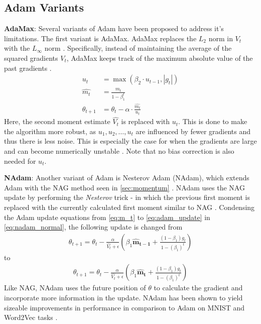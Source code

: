 \subsection{Adam Variants}
\textbf{AdaMax}: Several variants of Adam have been proposed to address it's limitations. The first variant is AdaMax. AdaMax replaces the $L_2$ norm in $V_t$ with the $L_{\infty}$ norm \citep{kingma2014adam}. Specifically, instead of maintaining the average of the squared gradients $V_t$, AdaMax keeps track of the maximum absolute value of the past gradients \citep{kingma2014adam}.
\begin{align}
    u_t &= \max(\beta_2 \cdot u_{t-1}, |g_t|) \\ 
    \hat{m_t} &= \frac{m_t}{1 - \beta_1^t} \\
    \theta_{t+1} &= \theta_t - \alpha \cdot \frac{\hat{m_t}}{u_t}
\end{align}
Here, the second moment estimate $\hat{V_t}$ is replaced with $u_t$. This is done to make the algorithm more robust, as $u_1, u_2, \dots, u_t$ are influenced by fewer gradients and thus there is less noise. This is especially the case for when the gradients are large and can become numerically unstable \citep{kingma2014adam}. Note that no bias correction is also needed for $u_t$.

\textbf{NAdam}: Another variant of Adam is Nesterov Adam (NAdam), which extends Adam with the NAG method seen in \cref{sec:momentum} \citep{dozat2016nadam}. NAdam uses the NAG update by performing the \textit{Nesterov} trick - in which the previous first moment is replaced with the currently calculated first moment similar to NAG \citep{nesterov1983method,dozat2016nadam}. Condensing the Adam update equations from \cref{eq:m_t} to \cref{eq:adam_update} in \cref{eq:nadam_normal}, the following update is changed from 
\begin{align}
    \theta_{t+1} = \theta_t - \frac{\alpha}{{\hat{V_t}} + \epsilon} (\beta_1 \mathbf{\hat{m}_{t-1}} + \frac{(1 - \beta_1)g_t}{1 - (\beta_1)^t}) \label{eq:nadam_normal}
\end{align}
to 
\begin{align}
    \theta_{t+1} = \theta_t - \frac{\alpha}{{\hat{V_t}} + \epsilon} (\beta_1 \mathbf{\hat{m}_{t}} + \frac{(1 - \beta_1)g_t}{1 - (\beta_1)^t})
\end{align}
Like NAG, NAdam uses the future position of $\theta$ to calculate the gradient and incorporate more information in the update. NAdam has been shown to yield sizeable improvements in performance in comparison to Adam on MNIST and Word2Vec tasks \citep{dozat2016nadam}.

